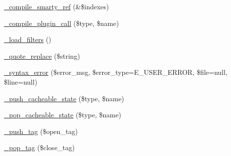 \begin{DoxyCompactItemize}
\item 
\mbox{\hyperlink{class_smarty___compiler_adc652b9fb4277fd8d33d957608394751}{\+\_\+compile\+\_\+smarty\+\_\+ref}} (\&\$indexes)
\item 
\mbox{\hyperlink{class_smarty___compiler_a302b33495a918bef95258bfb0285a30c}{\+\_\+compile\+\_\+plugin\+\_\+call}} (\$type, \$name)
\item 
\mbox{\hyperlink{class_smarty___compiler_ac3298ba7a8acc1bafeaeae5428c3571e}{\+\_\+load\+\_\+filters}} ()
\item 
\mbox{\hyperlink{class_smarty___compiler_abc08d6f05e29019bfff39a7e9d315feb}{\+\_\+quote\+\_\+replace}} (\$string)
\item 
\mbox{\hyperlink{class_smarty___compiler_a059eb89b6a2caca24b4dca502cb79ed9}{\+\_\+syntax\+\_\+error}} (\$error\+\_\+msg, \$error\+\_\+type=E\+\_\+\+U\+S\+E\+R\+\_\+\+E\+R\+R\+OR, \$file=null, \$line=null)
\item 
\mbox{\hyperlink{class_smarty___compiler_aecdd6b87ba3fdd6efb84b56c5e4dde17}{\+\_\+push\+\_\+cacheable\+\_\+state}} (\$type, \$name)
\item 
\mbox{\hyperlink{class_smarty___compiler_a93a26417dd094b744f7835099e24df0b}{\+\_\+pop\+\_\+cacheable\+\_\+state}} (\$type, \$name)
\item 
\mbox{\hyperlink{class_smarty___compiler_a553d4bd92f21bc3714bf1cadeb61a9d7}{\+\_\+push\+\_\+tag}} (\$open\+\_\+tag)
\item 
\mbox{\hyperlink{class_smarty___compiler_a17a75d1aa9db594013757d6a829436a9}{\+\_\+pop\+\_\+tag}} (\$close\+\_\+tag)
\end{DoxyCompactItemize}
